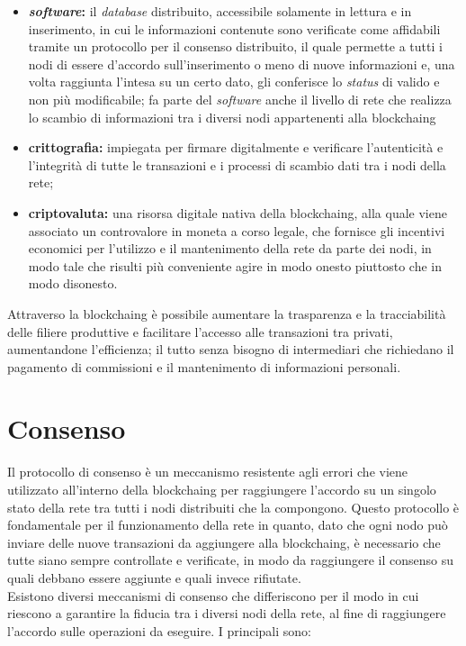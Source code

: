\begin{itemize}
	\item \textbf{\textit{software}:} il \textit{database} distribuito, accessibile solamente in lettura e in inserimento, in cui le informazioni contenute sono verificate come affidabili tramite un protocollo per il consenso distribuito, il quale permette a tutti i nodi di essere d'accordo sull'inserimento o meno di nuove informazioni e, una volta raggiunta l'intesa su un certo dato, gli conferisce lo \textit{status} di valido e non più modificabile; fa parte del \textit{software} anche il livello di rete che realizza lo scambio di informazioni tra i diversi nodi appartenenti alla \gls{blockchaing}
	\item \textbf{crittografia:} impiegata per firmare digitalmente e verificare l'autenticità e l'integrità di tutte le transazioni e i processi di scambio dati tra i nodi della rete;
	\item \textbf{criptovaluta:} una risorsa digitale nativa della \gls{blockchaing}, alla quale viene associato un controvalore in moneta a corso legale, che fornisce gli incentivi economici per l'utilizzo e il mantenimento della rete da parte dei nodi, in modo tale che risulti più conveniente agire in modo onesto piuttosto che in modo disonesto.
\end{itemize}
Attraverso la \gls{blockchaing} è possibile aumentare la trasparenza e la tracciabilità delle filiere produttive e facilitare l'accesso alle transazioni tra privati, aumentandone l'efficienza; il tutto senza bisogno di intermediari che richiedano il pagamento di commissioni e il mantenimento di informazioni personali.

\section{Consenso}

Il protocollo di consenso è un meccanismo resistente agli errori che viene utilizzato all'interno della \gls{blockchaing} per raggiungere l'accordo su un singolo stato della rete tra tutti i nodi distribuiti che la compongono. Questo protocollo è fondamentale per il funzionamento della rete in quanto, dato che ogni nodo può inviare delle nuove transazioni da aggiungere alla \gls{blockchaing}, è necessario che tutte siano sempre controllate e verificate, in modo da raggiungere il consenso su quali debbano essere aggiunte e quali invece rifiutate.\\
Esistono diversi meccanismi di consenso che differiscono per il modo in cui riescono a garantire la fiducia tra i diversi nodi della rete, al fine di raggiungere l'accordo sulle operazioni da eseguire. I principali sono:

